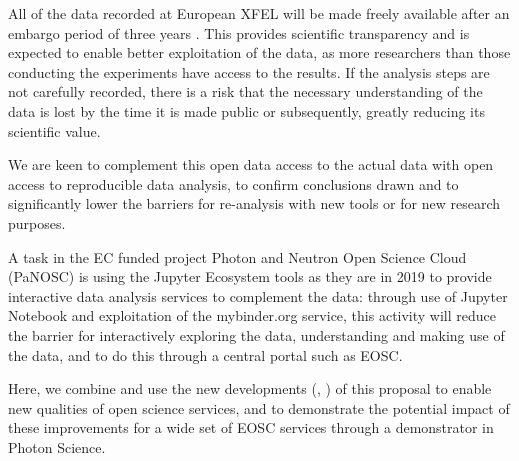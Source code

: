   All of the data recorded at European XFEL will be made freely
  available after an embargo period of three years
  \cite{EuXFEL-datapolicy-2017}. This provides scientific transparency
  and is expected to enable better exploitation of the data, as more
  researchers than those conducting the experiments have access to the
  results. If the analysis steps are not carefully recorded, there is a risk
  that the necessary understanding of the data is lost by the time it
  is made public or subsequently, greatly reducing its scientific
  value.

  We are keen to complement this open data access to the actual data
  with open access to reproducible data analysis, to confirm
  conclusions drawn and to significantly lower the barriers for
  re-analysis with new tools or for new research purposes.

  A task in the EC funded project Photon and Neutron Open Science
  Cloud (PaNOSC) is using the Jupyter Ecosystem tools as they are in
  2019 to provide interactive data analysis services to complement the
  data: through use of Jupyter Notebook and exploitation of the
  mybinder.org service, this activity will reduce the barrier for
  interactively exploring the data, understanding and making use of
  the data, and to do this through a central portal such as EOSC.

  Here, we combine and use the new developments (,
  ) of this
  proposal to enable new qualities of open science services, and to
  demonstrate the potential impact of these improvements for a wide
  set of EOSC services through a demonstrator in Photon Science.

  \medskip


